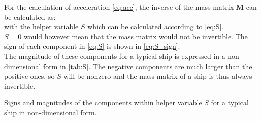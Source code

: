For the calculation of acceleration \autoref{eq:acc}, the inverse of the mass matrix $\mathbf{M}$ can be calculated as:
\begin{equation}
    \label{eq:M_inv}
    
\end{equation}
with the helper variable $S$ which can be calculated according to \autoref{eq:S}. 
\begin{equation}
    \label{eq:S}
    
\end{equation}
$S=0$ would however mean that the mass matrix would not be invertible. The sign of each component in \autoref{eq:S} is shown in \autoref{eq:S_sign}.  
\begin{equation}
    \label{eq:S_sign}
    
\end{equation}
The magnitude of these components for a typical ship is expressed in a non-dimensional form in \autoref{tab:S}. The negative components are much larger than the positive ones, so $S$ will be nonzero and the mass matrix of a ship is thus always invertible.      
\begin{table}[h]
    \centering
    \small
    \caption{Signs and magnitudes of the components within helper variable $S$ for a typical ship in non-dimensional form.}
    \label{tab:S}
\end{table}
\FloatBarrier
